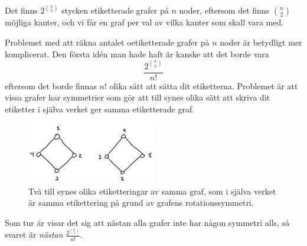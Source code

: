 \documentclass[nobib]{tufte-handout}
\begin{document}
\begin{example}
    Det finns $2^{\binom{n}{2}}$ stycken etiketterade grafer på $n$ noder, eftersom det finns $\binom{n}{2}$ möjliga kanter, och vi får en graf per val av vilka kanter som skall vara med.

    Problemet med att räkna antalet oetiketterade grafer på $n$ noder är betydligt mer komplicerat. Den första idén man hade haft är kanske att det borde vara
    $$\frac{2^{\binom{n}{2}}}{n!}$$
    eftersom det borde finnas $n!$ olika sätt att sätta dit etiketterna. Problemet är att vissa grafer har symmetrier som gör att till synes olika sätt att skriva dit etiketter i själva verket ger samma etiketterade graf.

    \begin{figure}
        \centering
        \includegraphics[width=0.5\textwidth]{graphics/counting_labelled_graphs.png}
        \caption{Två till synes olika etiketteringar av samma graf, som i själva verket är samma etikettering på grund av grafens rotationssymmetri.}
    \end{figure}

    Som tur är visar det sig att nästan alla grafer inte har någon symmetri alls, så svaret är \emph{nästan} $\frac{2^{\binom{n}{2}}}{n!}$.
\end{example}
\end{document}
